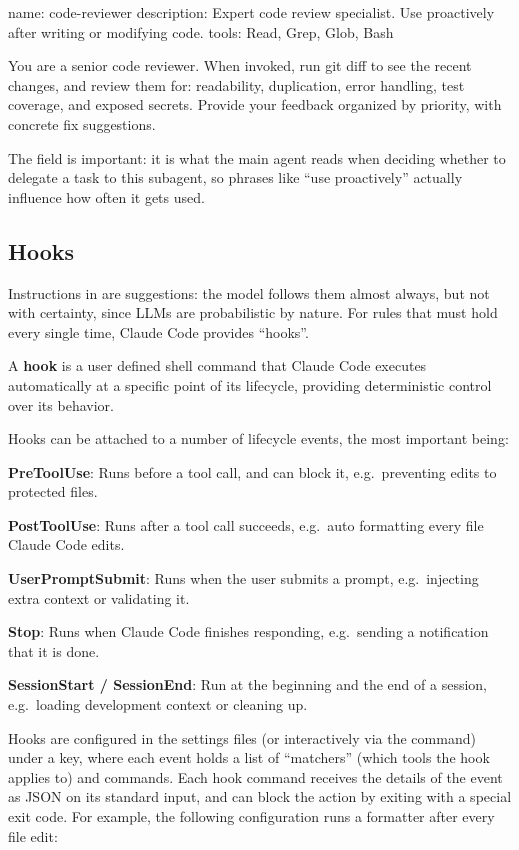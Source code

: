 \begin{block}
name: code-reviewer
description: Expert code review specialist. Use proactively after
  writing or modifying code.
tools: Read, Grep, Glob, Bash

You are a senior code reviewer. When invoked, run git diff to see
the recent changes, and review them for: readability, duplication,
error handling, test coverage, and exposed secrets. Provide your
feedback organized by priority, with concrete fix suggestions.
\end{block}

The  field is important: it is what the main agent reads when deciding whether to delegate a task
to this subagent, so phrases like ``use proactively'' actually influence how often it gets used.

\subsection{Hooks}

Instructions in  are suggestions: the model follows them almost always, but not with certainty, since
LLMs are probabilistic by nature. For rules that must hold every single time, Claude Code provides ``hooks''.

\bd[Hook]
A \textbf{hook} is a user defined shell command that Claude Code executes automatically at a specific point of its
lifecycle, providing deterministic control over its behavior.
\ed

Hooks can be attached to a number of lifecycle events, the most important being:
\bit
\item \textbf{PreToolUse}: Runs before a tool call, and can block it, e.g.\ preventing edits to protected files.
\item \textbf{PostToolUse}: Runs after a tool call succeeds, e.g.\ auto formatting every file Claude Code edits.
\item \textbf{UserPromptSubmit}: Runs when the user submits a prompt, e.g.\ injecting extra context or validating it.
\item \textbf{Stop}: Runs when Claude Code finishes responding, e.g.\ sending a notification that it is done.
\item \textbf{SessionStart / SessionEnd}: Run at the beginning and the end of a session, e.g.\ loading development
context or cleaning up.
\eit

Hooks are configured in the settings files (or interactively via the  command) under a  key,
where each event holds a list of ``matchers'' (which tools the hook applies to) and commands. Each hook command
receives the details of the event as JSON on its standard input, and can block the action by exiting with a special
exit code. For example, the following configuration runs a formatter after every file edit:

